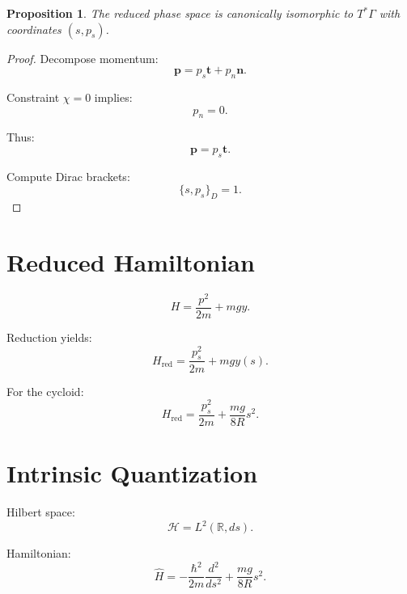 \documentclass[11pt]{article}
\newtheorem{proposition}{Proposition}
\begin{document}
\begin{proposition}
The reduced phase space is canonically isomorphic to $T^*\Gamma$ with coordinates $(s,p_s)$.
\end{proposition}

\begin{proof}
Decompose momentum:
\begin{equation}
\mathbf{p} = p_s \mathbf{t} + p_n \mathbf{n}.
\end{equation}

Constraint $\chi=0$ implies:
\begin{equation}
p_n=0.
\end{equation}

Thus:
\begin{equation}
\mathbf{p} = p_s \mathbf{t}.
\end{equation}

Compute Dirac brackets:
\begin{equation}
\{s,p_s\}_D = 1.
\end{equation}
\end{proof}

\section{Reduced Hamiltonian}

\begin{equation}
H = \frac{p^2}{2m} + mgy.
\end{equation}

Reduction yields:
\begin{equation}
H_{\text{red}} =
\frac{p_s^2}{2m} + mgy(s).
\end{equation}

For the cycloid:
\begin{equation}
H_{\text{red}} =
\frac{p_s^2}{2m} + \frac{mg}{8R}s^2.
\end{equation}

\section{Intrinsic Quantization}

Hilbert space:
\begin{equation}
\mathcal{H} = L^2(\mathbb{R},ds).
\end{equation}

Hamiltonian:
\begin{equation}
\hat{H} =
-\frac{\hbar^2}{2m}\frac{d^2}{ds^2}
+ \frac{mg}{8R}s^2.
\end{equation}
\end{document}
